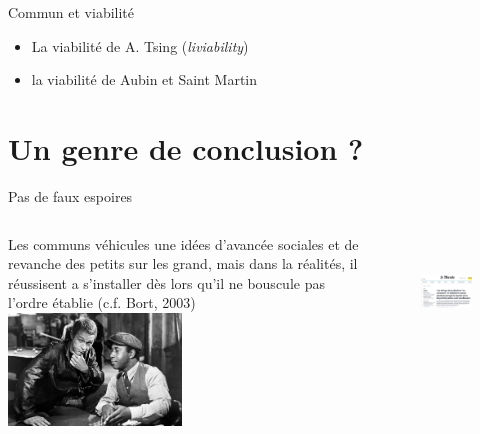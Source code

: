 \documentclass[newPxFont]{beamer}
\begin{document}
\begin{frame}[c]{Commun et viabilité}
  \vspace{-1cm}
  \begin{itemize}
    \item La viabilité de A. Tsing (\textit{liviability})
    \item la viabilité de Aubin et Saint Martin
  \end{itemize}


\end{frame}


\section{Un genre de conclusion ?}

\begin{frame}[c]{Pas de faux espoires}
\vspace{-1cm}
\begin{columns}[onlytextwidth,T]
  \column{\dimexpr\linewidth-30mm-5mm}
  \small{Les communs véhicules une idées d'avancée sociales et de revanche des petits sur les grand, mais dans la réalités, il réussisent a s'installer dès lors qu'il ne bouscule pas l'ordre établie (c.f. Bort, 2003)}\\
  \vspace{0.5cm}
  \includegraphics[height=3cm]{img/thecincinnatiKid.jpg}

  \column{35mm}
  \begin{figure}
    \includegraphics[height=3cm]{img/leMonde301023.png}
  \end{figure}

\end{columns}
\end{frame}
\end{document}
